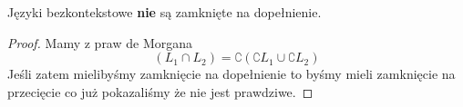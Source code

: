 \begin{theorem}
    Języki bezkontekstowe \textbf{nie} są zamknięte na dopełnienie.
\end{theorem}
\begin{proof}
    Mamy z praw de Morgana
    \[
        (L_1 \cap L_2) = \complement{(\complement{L_1} \cup \complement{L_2})}
    \]
    Jeśli zatem mielibyśmy zamknięcie na dopełnienie to byśmy mieli zamknięcie na przecięcie co już pokazaliśmy że nie jest prawdziwe.
\end{proof}